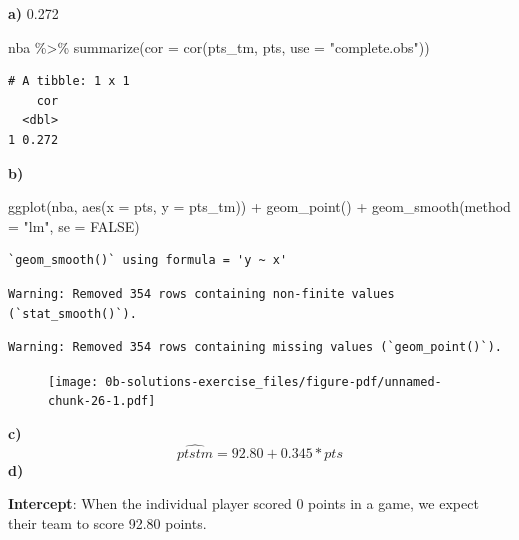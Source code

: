 \documentclass[
  letterpaper,
  DIV=11,
  numbers=noendperiod]{scrreprt}
\newenvironment{Shaded}{\begin{snugshade}}{\end{snugshade}}
\newcommand{\AttributeTok}[1]{\textcolor[rgb]{0.40,0.45,0.13}{#1}}
\newcommand{\ConstantTok}[1]{\textcolor[rgb]{0.56,0.35,0.01}{#1}}
\newcommand{\FunctionTok}[1]{\textcolor[rgb]{0.28,0.35,0.67}{#1}}
\newcommand{\NormalTok}[1]{\textcolor[rgb]{0.00,0.23,0.31}{#1}}
\newcommand{\SpecialCharTok}[1]{\textcolor[rgb]{0.37,0.37,0.37}{#1}}
\newcommand{\StringTok}[1]{\textcolor[rgb]{0.13,0.47,0.30}{#1}}
\theoremstyle{definition}
\theoremstyle{remark}
\begin{document}
\textbf{a)} 0.272

\begin{Shaded}
\begin{Highlighting}[]
\NormalTok{nba }\SpecialCharTok{\%\textgreater{}\%} 
  \FunctionTok{summarize}\NormalTok{(}\AttributeTok{cor =} \FunctionTok{cor}\NormalTok{(pts\_tm, pts, }\AttributeTok{use =} \StringTok{"complete.obs"}\NormalTok{))}
\end{Highlighting}
\end{Shaded}

\begin{verbatim}
# A tibble: 1 x 1
    cor
  <dbl>
1 0.272
\end{verbatim}

\textbf{b)}

\begin{Shaded}
\begin{Highlighting}[]
\FunctionTok{ggplot}\NormalTok{(nba, }\FunctionTok{aes}\NormalTok{(}\AttributeTok{x =}\NormalTok{ pts, }\AttributeTok{y =}\NormalTok{ pts\_tm)) }\SpecialCharTok{+}
  \FunctionTok{geom\_point}\NormalTok{() }\SpecialCharTok{+}
  \FunctionTok{geom\_smooth}\NormalTok{(}\AttributeTok{method =} \StringTok{"lm"}\NormalTok{, }\AttributeTok{se =} \ConstantTok{FALSE}\NormalTok{)}
\end{Highlighting}
\end{Shaded}

\begin{verbatim}
`geom_smooth()` using formula = 'y ~ x'
\end{verbatim}

\begin{verbatim}
Warning: Removed 354 rows containing non-finite values (`stat_smooth()`).
\end{verbatim}

\begin{verbatim}
Warning: Removed 354 rows containing missing values (`geom_point()`).
\end{verbatim}

\begin{figure}[H]

{\centering \texttt{[image: 0b-solutions-exercise\_files/figure-pdf/unnamed-chunk-26-1.pdf]}

}

\end{figure}

\textbf{c)} \[\widehat{pts tm} = 92.80 + 0.345*pts\] \textbf{d)}

\textbf{Intercept}: When the individual player scored 0 points in a
game, we expect their team to score 92.80 points.
\end{document}
